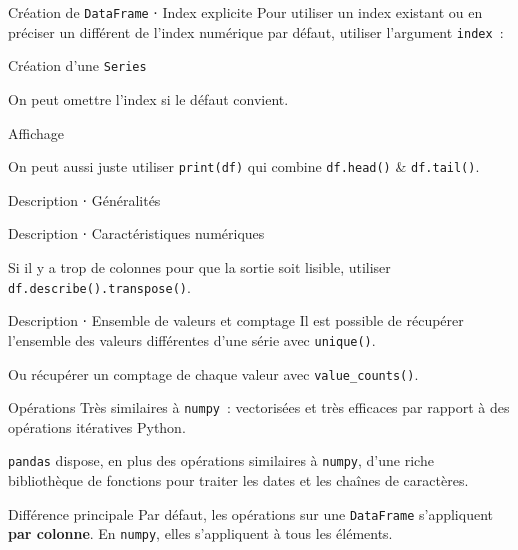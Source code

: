 \begin{frame}{Création de \texttt{DataFrame} ⋅ Index explicite}
  Pour utiliser un index existant ou en préciser un différent de l'index numérique par défaut, utiliser l'argument \texttt{index}~:

\end{frame}

\begin{frame}{Création d'une \texttt{Series}}

  On peut omettre l'index si le défaut convient.
\end{frame}

\begin{frame}{Affichage}

  On peut aussi juste utiliser \texttt{print(df)} qui combine \texttt{df.head()} \& \texttt{df.tail()}.
\end{frame}

\begin{frame}{Description ⋅ Généralités}
\end{frame}

\begin{frame}{Description ⋅ Caractéristiques numériques}

  Si il y a trop de colonnes pour que la sortie soit lisible, utiliser \texttt{df.describe().transpose()}.
\end{frame}

\begin{frame}{Description ⋅ Ensemble de valeurs et comptage}
  Il est possible de récupérer l'ensemble des valeurs différentes d'une série avec \texttt{unique()}.
  
  Ou récupérer un comptage de chaque valeur avec \texttt{value\_counts()}.
\end{frame}

\begin{frame}{Opérations}
  Très similaires à \texttt{numpy}~: vectorisées et très efficaces par rapport à des opérations itératives Python.

  \texttt{pandas} dispose, en plus des opérations similaires à \texttt{numpy}, d'une riche bibliothèque de fonctions pour traiter les dates et les chaînes de caractères.

  \begin{alertblock}{Différence principale}
    Par défaut, les opérations sur une \texttt{DataFrame} s'appliquent \textbf{par colonne}. En \texttt{numpy}, elles s'appliquent à tous les éléments.
  \end{alertblock}
\end{frame}

